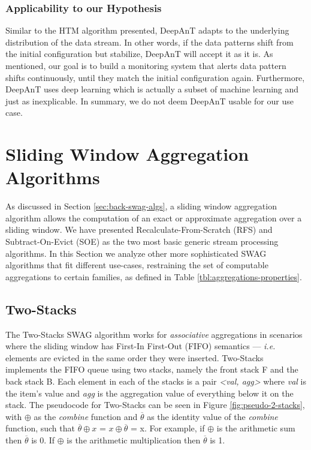 \subsubsection*{Applicability to our Hypothesis}

Similar to the HTM algorithm presented, DeepAnT adapts to the underlying distribution of the data stream. In other words, if the data patterns shift from the initial configuration but stabilize, DeepAnT will accept it as it is. As mentioned, our goal is to build a monitoring system that alerts data pattern shifts continuously, until they match the initial configuration again. Furthermore, DeepAnT uses deep learning which is actually a subset of machine learning and just as inexplicable. In summary, we do not deem DeepAnT usable for our use case.


\section{Sliding Window Aggregation Algorithms} \label{sec:sota-swag-algs}

As discussed in Section \ref{sec:back-swag-algs}, a sliding window aggregation algorithm allows the computation of an exact or approximate aggregation over a sliding window. We have presented Recalculate-From-Scratch (RFS) and Subtract-On-Evict (SOE) as the two most basic generic stream processing algorithms. In this Section we analyze other more sophisticated SWAG algorithms that fit different use-cases, restraining the set of computable aggregations to certain families, as defined in Table \ref{tbl:aggregations-properties}.

\subsection{Two-Stacks}
The Two-Stacks SWAG algorithm works for \textit{associative} aggregations in scenarios where the sliding window has First-In First-Out (FIFO) semantics --- \textit{i.e.} elements are evicted in the same order they were inserted. Two-Stacks \cite{Tangwongsan-DABA} implements the FIFO queue using two stacks, namely the front stack F and the back stack B. Each element in each of the stacks is a pair \textit{<val, agg>} where \textit{val} is the item's value and \textit{agg} is the aggregation value of everything below it on the stack. The pseudocode for Two-Stacks can be seen in Figure \ref{fig:pseudo-2-stacks}, with $\oplus$ as the \textit{combine} function and $\overline{\theta}$ as the identity value of the \textit{combine} function, such that $\overline{\theta} \oplus x$ = $x \oplus \overline{\theta}$ = x. For example, if $\oplus$ is the arithmetic sum then $\overline{\theta}$ is 0. If $\oplus$ is the arithmetic multiplication then $\overline{\theta}$ is 1.

